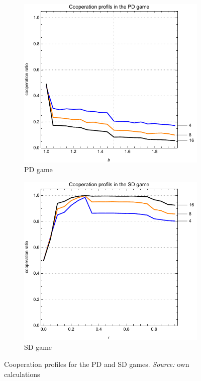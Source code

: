 \documentclass[english, twoside, 12pt, a4paper]{article}
\theoremstyle{definition}
\theoremstyle{plain}
\theoremstyle{remark}
\begin{document}
 \begin{figure}[hbt]
  \centering
  \begin{subfigure}[t]{0.45\textwidth}
    \includegraphics[width=\textwidth]{../ramsza/figs/PD_profiles.pdf}
    \caption{PD game}
    \label{fig:resa}
  \end{subfigure}
  \hfill
  \begin{subfigure}[t]{0.45\textwidth}
    \includegraphics[width=\textwidth]{../ramsza/figs/SD_profiles.pdf}
    \caption{SD game}
    \label{fig:resb}
  \end{subfigure}

  
  \captionsetup{margin=10pt,font=small,labelfont=bf,width=.8\textwidth}

  \caption[Cooperation profiles]{Cooperation profiles for the PD and SD games. \textit{Source:} own calculations}\label{fig:res}
\end{figure}
\end{document}
